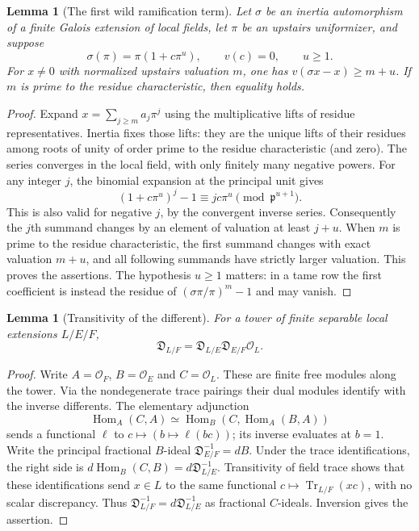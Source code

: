 \documentclass[11pt]{amsart}
\newtheorem{lemma}[theorem]{Lemma}
\theoremstyle{definition}
\theoremstyle{remark}
\newcommand{\Tr}{\operatorname{Tr}}
\newcommand{\OO}{\mathcal O}\newcommand{\pp}{\mathfrak p}\newcommand{\PP}{\mathfrak P}
\begin{document}
\begin{lemma}[The first wild ramification term]\label{C:leading-ramification}
Let $\sigma$ be an inertia automorphism of a finite Galois extension
of local fields, let $\pi$ be an upstairs uniformizer, and suppose
\[
 \sigma(\pi)=\pi(1+c\pi^u),\qquad v(c)=0,\qquad u\ge1.
\]
For $x\ne0$ with normalized upstairs valuation $m$, one has
$v(\sigma x-x)\ge m+u$. If $m$ is prime to the residue characteristic,
then equality holds.
\end{lemma}
\begin{proof}
Expand $x=\sum_{j\ge m}a_j\pi^j$ using the multiplicative lifts of
residue representatives. Inertia fixes those lifts: they are the
unique lifts of their residues among roots of unity of order prime
to the residue characteristic (and zero). The series converges in
the local field, with only finitely many negative powers. For any
integer $j$, the binomial expansion at the principal unit gives
\[
 (1+c\pi^u)^j-1\equiv jc\pi^u\pmod{\pp^{u+1}}.
\]
This is also valid for negative $j$, by the convergent inverse series.
Consequently the $j$th summand changes by an element of valuation at
least $j+u$. When $m$ is prime to the residue characteristic, the
first summand changes with exact valuation $m+u$, and all following
summands have strictly larger valuation. This proves the assertions.
The hypothesis $u\ge1$ matters: in a tame row the first coefficient
is instead the residue of $(\sigma\pi/\pi)^m-1$ and may vanish.
\end{proof}

\begin{lemma}[Transitivity of the different]\label{C:different-tower}
For a tower of finite separable local extensions $L/E/F$,
\[
 \mathfrak D_{L/F}
      =\mathfrak D_{L/E}\mathfrak D_{E/F}\OO_L.
\]
\end{lemma}
\begin{proof}
Write $A=\OO_F$, $B=\OO_E$ and $C=\OO_L$. These are finite free
modules along the tower. Via the nondegenerate trace pairings their
dual modules identify with the inverse differents. The elementary
adjunction
\[
 \operatorname{Hom}_A(C,A)
   \simeq\operatorname{Hom}_B(C,\operatorname{Hom}_A(B,A))
\]
sends a functional $\ell$ to $c\mapsto(b\mapsto\ell(bc))$; its
inverse evaluates at $b=1$. Write the principal fractional $B$-ideal
$\mathfrak D_{E/F}^{-1}=dB$. Under the trace identifications, the
right side is $d\operatorname{Hom}_B(C,B)
=d\mathfrak D_{L/E}^{-1}$. Transitivity of field trace shows that
these identifications send $x\in L$ to the same functional
$c\mapsto\Tr_{L/F}(xc)$, with no scalar discrepancy. Thus
$\mathfrak D_{L/F}^{-1}=d\mathfrak D_{L/E}^{-1}$ as fractional
$C$-ideals. Inversion gives the assertion.
\end{proof}
\end{document}
